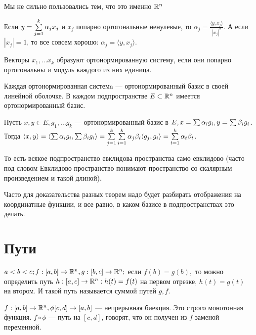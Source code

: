 \documentclass[12pt]{report}
\begin{document}
\begin{note}
Мы не сильно пользовались тем, что это именно $\mathbb{R}^n$
\end{note}

\begin{cor}
Если $y = \sum\limits_{j = 1}^k{\alpha_jx_j}$ и $x_j$ попарно ортогональные ненулевые, то $\alpha_j  = \frac{\langle y, x_j\rangle}{|x_j|^2}$. А если $|x_j| = 1$, то все совсем хорошо: $\alpha_j = \langle y, x_j\rangle$.
\end{cor}

\begin{defn}
Векторы $x_1, \dots x_k$ образуют ортонормированную систему, если они попарно ортогональны и модуль каждого из них единица.
\end{defn}

\begin{note}
Каждая ортонормированная системa --- ортонормированный базис в своей линейной оболочке. В каждом подпространстве $E \subset \mathbb{R}^n$ имеется ортонормированный базис.

Пусть $x, y \in E, g_1, \dots g_k$ --- ортонормированный базис в $E, x = \sum\limits{\alpha_i g_i}, y = \sum\limits{\beta_i g_i}$. Тогда $\langle x, y\rangle = \langle \sum\limits{\alpha_i g_i}, \sum\limits{\beta_i g_i}\rangle = \sum\limits_{j = 1}^k{\sum\limits_{i = 1}^k{\alpha_j\beta_i\langle g_j, g_i\rangle}} = \sum\limits_{t = 1}^k{\alpha_t \beta_t}$.

То есть всякое подпространство евклидова пространства само евклидово (часто под словом Евклидово пространство понимают пространство со скалярным произведением и такой длиной).

Часто для доказательства разных теорем надо будет разбирать отображения на координатные функции, и все равно, в каком базисе в подпространствах это делать.
\end{note}

\section{Пути}

\begin{defn}
$a < b < c; f: [a, b] \to \mathbb{R}^n, g: [b, c] \to \mathbb{R}^n;$ если $f(b) = g(b),$ то можно определить путь $h: [a, c] \to \mathbb{R}^n: h(t) = f(t)$ на первом отрезке, $h(t) = g(t)$ на втором. И такой путь называется суммой путей $g, f$.
\end{defn}

\begin{defn}
$f: [a, b] \to \mathbb{R}^n, \phi [c, d] \to [a, b]$ --- непрерывная биекция. Это строго монотонная функция. $f \circ \phi$ --- путь на $[c, d]$, говорят, что он получен из $f$ заменой переменной.
\end{defn}
\end{document}

